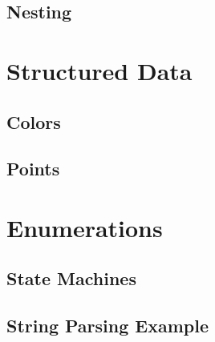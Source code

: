 \subsection{Nesting}

\section{Structured Data}

\subsection{Colors}

\subsection{Points}

\section{Enumerations}

\subsection{State Machines}

\subsection{String Parsing Example}

